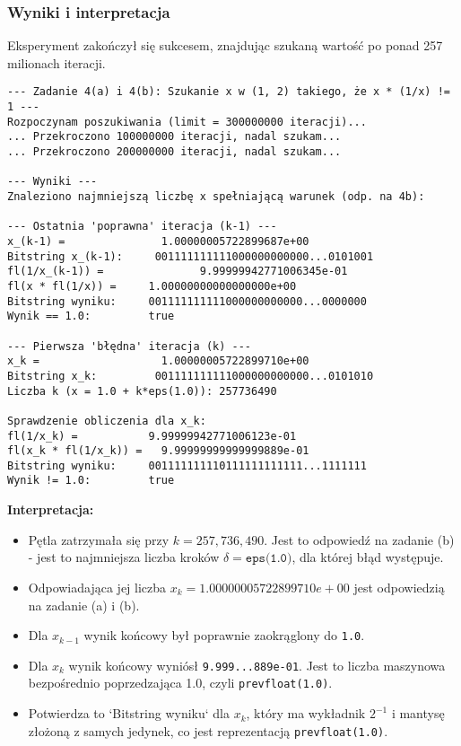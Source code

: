 \documentclass[11pt, a4paper]{article}
\begin{document}
\subsubsection{Wyniki i interpretacja}
Eksperyment zakończył się sukcesem, znajdując szukaną wartość po ponad 257 milionach iteracji.
\begin{verbatim}
--- Zadanie 4(a) i 4(b): Szukanie x w (1, 2) takiego, że x * (1/x) != 1 ---
Rozpoczynam poszukiwania (limit = 300000000 iteracji)...
... Przekroczono 100000000 iteracji, nadal szukam...
... Przekroczono 200000000 iteracji, nadal szukam...

--- Wyniki ---
Znaleziono najmniejszą liczbę x spełniającą warunek (odp. na 4b):

--- Ostatnia 'poprawna' iteracja (k-1) ---
x_(k-1) =               1.00000005722899687e+00
Bitstring x_(k-1):     001111111111000000000000...0101001
fl(1/x_(k-1)) =               9.99999942771006345e-01
fl(x * fl(1/x)) =     1.00000000000000000e+00
Bitstring wyniku:     001111111111000000000000...0000000
Wynik == 1.0:         true

--- Pierwsza 'błędna' iteracja (k) ---
x_k =                   1.00000005722899710e+00
Bitstring x_k:         001111111111000000000000...0101010
Liczba k (x = 1.0 + k*eps(1.0)): 257736490

Sprawdzenie obliczenia dla x_k:
fl(1/x_k) =           9.99999942771006123e-01
fl(x_k * fl(1/x_k)) =   9.99999999999999889e-01
Bitstring wyniku:     001111111110111111111111...1111111
Wynik != 1.0:         true

\end{verbatim}

\noindent \textbf{Interpretacja:}
\begin{itemize}
    \item Pętla zatrzymała się przy $k = 257,736,490$. Jest to odpowiedź na zadanie (b) - jest to najmniejsza liczba kroków $\delta = \texttt{eps(1.0)}$, dla której błąd występuje.
    \item Odpowiadająca jej liczba $x_k = 1.00000005722899710e+00$ jest odpowiedzią na zadanie (a) i (b).
    \item Dla $x_{k-1}$ wynik końcowy był poprawnie zaokrąglony do \texttt{1.0}.
    \item Dla $x_k$ wynik końcowy wyniósł \texttt{9.999...889e-01}. Jest to liczba maszynowa bezpośrednio poprzedzająca 1.0, czyli \texttt{prevfloat(1.0)}.
    \item Potwierdza to `Bitstring wyniku` dla $x_k$, który ma wykładnik $2^{-1}$ i mantysę złożoną z samych jedynek, co jest reprezentacją \texttt{prevfloat(1.0)}.
\end{itemize}
\end{document}
